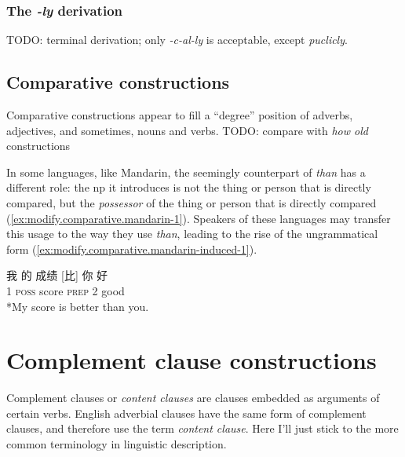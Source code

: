 \documentclass[UTF8, a4paper, oneside, scheme=plain, 12pt]{ctexbook}
\newcommand*{\term}[1]{\emph{#1}}
\newcommand{\form}[1]{\emph{#1}}
\newcommand{\category}[1]{\textsc{#1}}
\begin{document}
\subsection{The \form{-ly} derivation}

TODO: terminal derivation; only \form{-c-al-ly} is acceptable,
except \form{puclicly}.

\section{Comparative constructions}

Comparative constructions appear to fill a ``degree'' position
of adverbs, adjectives, and sometimes, nouns and verbs.
TODO: compare with \form{how old} constructions  

In some languages, like Mandarin, 
the seemingly counterpart of \form{than} 
has a different role: 
the \acs{np} it introduces is not the thing or person that is directly compared, 
but the \emph{possessor} of the thing or person that is directly compared
(\ref{ex:modify.comparative.mandarin-1}).
Speakers of these languages may transfer this usage 
to the way they use \form{than},
leading to the rise of the ungrammatical form (\ref{ex:modify.comparative.mandarin-induced-1}).

\begin{exe}
    \ex\label{ex:modify.comparative.mandarin-1} \gll 我 的 成绩 [比] 你 好 \\
    1 \category{poss} score \category{prep} 2 good \\
    \ex\label{ex:modify.comparative.mandarin-induced-1} *My score is better than you.
\end{exe}


\chapter{Complement clause constructions}\label{chap:clause-combining.complement-clause}

Complement clauses or \term{content clauses} \citep{cgel} are clauses embedded as arguments of certain verbs.
English adverbial clauses have the same form of complement clauses,
and therefore \citet{cgel} use the term \term{content clause}.
Here I'll just stick to the more common terminology in linguistic description.
\end{document}
